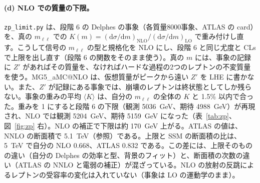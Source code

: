 \documentclass[a4paper,10pt]{ltjsarticle}
\makeatletter
\newcommand{\dd}{\mathrm{d}}
\newcommand{\MGaMC}{MG5\_aMC@NLO}
\makeatother
\begin{document}
\paragraph{(d) NLO での質量の下限。}\texttt{zp\_limit.py} は、段階 6 の Delphes の事象（各質量8000事象、ATLAS の card）を、真の $m_{\ell\ell}$ での $K(m)=(\dd\sigma/\dd m)_{\mathrm{NLO}}/(\dd\sigma/\dd m)_{\mathrm{LO}}$ で重み付けし直す。こうして信号の $m_{\ell\ell}$ の型と規格化を NLO にし、段階 6 と同じ尤度と CLs で上限を出し直す（段階 6 の関数をそのまま使う）。真の $m$ には、事象の記録に $Z'$ があればその質量を、なければハードな過程の2つのレプトンの不変質量を使う。\MGaMC{} は、仮想質量がピークから遠い $Z'$ を LHE に書かない。また、$Z'$ が記録にある事象では、崩壊のレプトンは終状態としてしか残らない。事象の重みの平均 $\langle K\rangle$ は、自分の $m_{\ell\ell}$ の全体の $K$ と 1.5\% 以内で合った。重みを 1 にすると段階 6 の下限（観測 5036~GeV、期待 4988~GeV）が再現され、NLO では観測 5204~GeV、期待 5159~GeV になった（表~\ref{tab:zp}、図~\ref{fig:zp} 右）。NLO の補正で下限は約 170~GeV 上がる。ATLAS の値は、NNLO の断面積で 5.1~TeV（参照）である。上限と SSM の断面積の比は、5~TeV で自分の NLO 0.668、ATLAS 0.832 である。この差には、上限そのものの違い（自分の Delphes の効率と型、背景のフィット）と、断面積の次数の違い（ATLAS の NNLO と電弱の補正）が混ざっている。NLO の放射の反跳によるレプトンの受容率の変化は入れていない（事象は LO の運動学のまま）。
\end{document}
